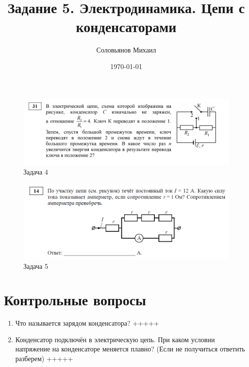 \documentclass[a4paper,12pt]{article} %
\author{Соловьянов Михаил }
\title{Задание 5. Электродинамика.  Цепи с конденсаторами}
\date{\today}
\begin{document}
\maketitle



\begin{figure}[H]
  \includegraphics[width=\linewidth]{1.PNG}
  \caption{Задача 4 }
  \label{task1}
\end{figure}
 
 
 
\begin{figure}[H]
  \includegraphics[width=\linewidth]{2.PNG}
  \caption{Задача 5 }
  \label{task2}
\end{figure}





\section{Контрольные вопросы}
\begin{enumerate}

\item Что называется зарядом конденсатора?  \colorbox{BrickRed}{+++++}
\item Конденсатор подключён в электрическую цепь. При каком условии напряжение на конденсаторе меняется плавно? (Если не получиться ответить разберем) \colorbox{BrickRed}{+++++}
\end{enumerate}
\end{document}
